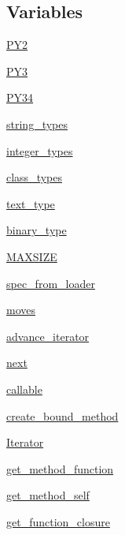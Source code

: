 \subsection*{Variables}
\begin{DoxyCompactItemize}
\item 
\hyperlink{namespacesix_aae353bc6b7f49f063f3df663b51bdc64}{P\+Y2}
\item 
\hyperlink{namespacesix_a0604d9501f588d59f1da389f5b47b7ff}{P\+Y3}
\item 
\hyperlink{namespacesix_ab1c2d3ed760139f44def61160d30871f}{P\+Y34}
\item 
\hyperlink{namespacesix_ad355223ed31cca422c1c6261935f00b6}{string\+\_\+types}
\item 
\hyperlink{namespacesix_ab69ddf0a905ac83ca102d33638afe92b}{integer\+\_\+types}
\item 
\hyperlink{namespacesix_ac5a606fbb1fa94808d47fcf0da36f79e}{class\+\_\+types}
\item 
\hyperlink{namespacesix_ace0291fdfa94c168df97653542f18304}{text\+\_\+type}
\item 
\hyperlink{namespacesix_a9063602f8023da63466adbe85113e7e7}{binary\+\_\+type}
\item 
\hyperlink{namespacesix_a5c1f05855af95282335ce3d3780d21bb}{M\+A\+X\+S\+I\+ZE}
\item 
\hyperlink{namespacesix_a0d94791ac4da27b188fd6a9868a67c06}{spec\+\_\+from\+\_\+loader}
\item 
\hyperlink{namespacesix_aeef5acf662d9f0ffb5b058ee5eff9acd}{moves}
\item 
\hyperlink{namespacesix_a54297b1c9588655ddadf0bd50b85caaa}{advance\+\_\+iterator}
\item 
\hyperlink{namespacesix_ac38b4dddeaa6855982abf2a54397de47}{next}
\item 
\hyperlink{namespacesix_ae1fc3ab5b1e4002198efdf53f7d106be}{callable}
\item 
\hyperlink{namespacesix_a25755bd7c68858d48bdb7fe83a12deaf}{create\+\_\+bound\+\_\+method}
\item 
\hyperlink{namespacesix_a112d5ae62d2f7a5dd5ef73475f42ba64}{Iterator}
\item 
\hyperlink{namespacesix_a831039d464e495518c83fe04858b6d47}{get\+\_\+method\+\_\+function}
\item 
\hyperlink{namespacesix_a6a40a9da07a39cdb9b795dbfd6c5df9b}{get\+\_\+method\+\_\+self}
\item 
\hyperlink{namespacesix_a47a45665657a954b28c890018dbc4caf}{get\+\_\+function\+\_\+closure}

\end{DoxyCompactItemize}

